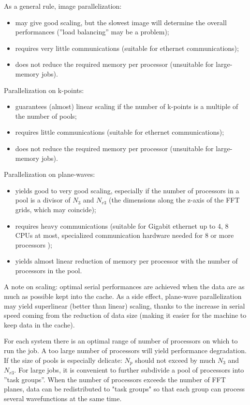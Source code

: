 \documentclass[12pt,a4paper]{article}
\begin{document}
As a general rule, image parallelization:
\begin{itemize}
\item  may give good scaling, but the slowest image will determine
the overall performances (''load balancing'' may be a problem);
\item requires very little communications (suitable for ethernet 
communications);
\item does not reduce the required memory per processor (unsuitable for 
large-memory jobs).
\end{itemize}
Parallelization on k-points:
\begin{itemize}
\item guarantees (almost) linear scaling if the number of k-points
is a multiple of the number of pools;
\item requires little communications (suitable for ethernet communications);
\item does not reduce the required memory per processor (unsuitable for 
large-memory jobs).
\end{itemize}
Parallelization on plane-waves:
\begin{itemize}
\item yields good to very good scaling, especially if the number of processors
in a pool is a divisor of $N_3$ and $N_{r3}$ (the dimensions along the z-axis 
of the FFT grids, which may coincide);
\item requires heavy communications (suitable for Gigabit ethernet up to 
4, 8 CPUs at most, specialized communication hardware needed for 8 or more
processors );
\item yields almost linear reduction of memory per processor with the number
of processors in the pool.
\end{itemize}

A note on scaling: optimal serial performances are achieved when the data are
as much as possible kept into the cache. As a side effect, plane-wave
parallelization may yield superlinear (better than linear) scaling,
thanks to the increase in serial speed coming from the reduction of data size 
(making it easier for the machine to keep data in the cache).

For each system there is an optimal range of number of processors on which to 
run the job.  A too large number of processors will yield performance 
degradation. If the size of pools is especially delicate: $N_p$ should not 
exceed by much $N_3$ and $N_{r3}$. For large jobs, it is convenient to 
further subdivide a pool of processors into ''task groups''.
When the number of processors exceeds the number of FFT planes, 
data can be redistributed to "task groups" so that each group 
can process several wavefunctions at the same time.
\end{document}

